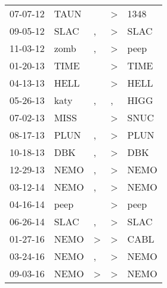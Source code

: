 \begin{supertabular}{p{0.07\textwidth}p{0.06\textwidth}p{0.02\textwidth}p{0.02\textwidth}p{0.06\textwidth}}
 07-07-12\textsuperscript{} &  TAUN\textsuperscript{} &               &     \textgreater &           1348\textsuperscript{} \\
 09-05-12\textsuperscript{} &  SLAC\textsuperscript{} &             , &     \textgreater &           SLAC\textsuperscript{} \\
 11-03-12\textsuperscript{} &  zomb\textsuperscript{} &             , &     \textgreater &           peep\textsuperscript{} \\
 01-20-13\textsuperscript{} &  TIME\textsuperscript{} &               &     \textgreater &           TIME\textsuperscript{} \\
 04-13-13\textsuperscript{} &  HELL\textsuperscript{} &               &     \textgreater &           HELL\textsuperscript{} \\
 05-26-13\textsuperscript{} &  katy\textsuperscript{} &             , &                , &           HIGG\textsuperscript{} \\
 07-02-13\textsuperscript{} &  MISS\textsuperscript{} &               &     \textgreater &           SNUC\textsuperscript{} \\
 08-17-13\textsuperscript{} &  PLUN\textsuperscript{} &             , &     \textgreater &           PLUN\textsuperscript{} \\
 10-18-13\textsuperscript{} &   DBK\textsuperscript{} &             , &     \textgreater &            DBK\textsuperscript{} \\
 12-29-13\textsuperscript{} &  NEMO\textsuperscript{} &             , &     \textgreater &           NEMO\textsuperscript{} \\
 03-12-14\textsuperscript{} &  NEMO\textsuperscript{} &             , &     \textgreater &           NEMO\textsuperscript{} \\
 04-16-14\textsuperscript{} &  peep\textsuperscript{} &               &     \textgreater &           peep\textsuperscript{} \\
 06-26-14\textsuperscript{} &  SLAC\textsuperscript{} &             , &     \textgreater &           SLAC\textsuperscript{} \\
 01-27-16\textsuperscript{} &  NEMO\textsuperscript{} &  \textgreater &     \textgreater &           CABL\textsuperscript{} \\
 03-24-16\textsuperscript{} &  NEMO\textsuperscript{} &             , &     \textgreater &           NEMO\textsuperscript{} \\
 09-03-16\textsuperscript{} &  NEMO\textsuperscript{} &  \textgreater &     \textgreater &           NEMO\textsuperscript{} \\

\end{supertabular}

